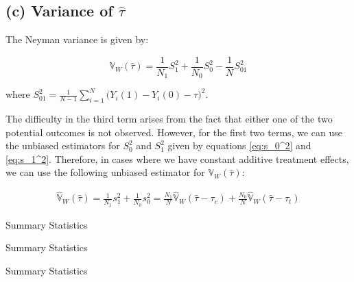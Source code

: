 \documentclass[11pt]{article}
\numberwithin{equation}{section}
\newcommand{\Var}{\mathbb{V}}
\begin{document}
\subsection*{(c) Variance of $\hat{\tau}$} 

The Neyman variance is given by:

\begin{equation}
    \Var_W(\hat\tau) = \frac{1}{N_1}S_1^2 + \frac{1}{N_0}S_0^2 - \frac{1}{N}S_{01}^2
\end{equation}

where $S_{01}^2 = \frac{1}{N-1}\sum_{i=1}^N \biggl(Y_i(1) - Y_i(0) - \tau \biggr)^2$.

The difficulty in the third term arises from the fact that either one of the two potential outcomes is not observed.
However, for the first two terms, we can use the unbiased estimators for $S_0^2$ and $S_1^2$ given by equations \eqref{eq:s_0^2} and \eqref{eq:s_1^2}.
Therefore, in cases where we have constant additive treatment effects, we can use the following unbiased estimator for $\Var_W(\hat\tau)$:

\begin{align}
    \hat{\Var}_W(\hat\tau) = \frac{1}{N_1}s_1^2 + \frac{1}{N_0}s_0^2  = \frac{N_1}{N}\hat{\Var}_W(\hat\tau - \tau_c) + \frac{N_0}{N}\hat{\Var}_W(\hat\tau - \tau_t)
\end{align}



\appendix
\setcounter{figure}{0}                      
\setcounter{table}{0}                      
\renewcommand\thefigure{A.\arabic{figure}} 
\renewcommand\thetable{A.\arabic{table}} 

\begin{table}
    \centering
    \tiny
    
    \caption{\label{tab:summary_stats}Summary Statistics}
\end{table}


\begin{table}
    \centering
    \tiny
    
    \caption{\label{tab:summary_stats(control_group)}Summary Statistics}
\end{table}


\begin{table}
    \centering
    \tiny
    
    \caption{\label{tab:summary_stats(treated_group)}Summary Statistics}
\end{table}


\printbibliography
\end{document}
